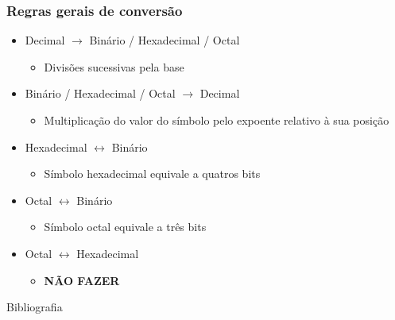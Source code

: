 \documentclass[aspectratio=169,
				xcolor=table]{beamer}
\begin{document}
		
		\begin{frame}
			\frametitle{Regras gerais de conversão}
			\begin{itemize}
				\item Decimal $\to$ Binário / Hexadecimal / Octal
				\begin{itemize}
					\item Divisões sucessivas pela base\\
				\end{itemize}
				\vspace{0.2cm}
				\item Binário / Hexadecimal / Octal $\to$ Decimal
				\begin{itemize}
					\item Multiplicação do valor do símbolo pelo expoente relativo à sua posição\\
				\end{itemize}
				\vspace{0.2cm}
				\item Hexadecimal $\leftrightarrow$ Binário 
				\begin{itemize}
					\item Símbolo hexadecimal equivale a quatros bits\\
				\end{itemize}
				\vspace{0.2cm}
				\item Octal $\leftrightarrow$ Binário 
				\begin{itemize}
					\item Símbolo octal equivale a três bits\\
				\end{itemize}
				\vspace{0.2cm}
				\item Octal $\leftrightarrow$ Hexadecimal
				\begin{itemize}
					\item \alert{\textbf{NÃO FAZER}}
				\end{itemize}
				\vspace{0.2cm}
			\end{itemize}
		\end{frame}
		
	\begin{frame}{Bibliografia}
		\nocite{Stallings2010}
    	
    	   	
	
	\end{frame}		

	\begin{frame}{}
	\end{frame}
\end{document}
